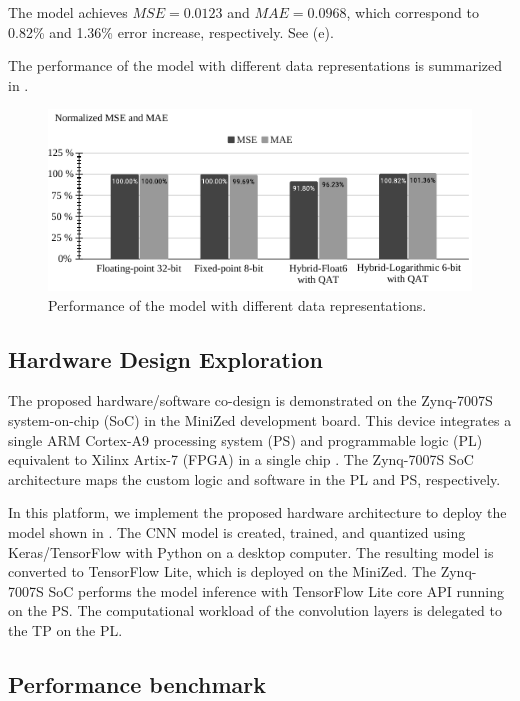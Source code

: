 The model achieves $MSE=0.0123$ and $MAE=0.0968$, which correspond to 0.82\% and 1.36\% error increase, respectively. See (e).

The performance of the model with different data representations is summarized in .

\begin{figure}[h!]
	\centering
	\includegraphics[width=\columnwidth]{../figures/histograms/Normalized_MSE_and_MAE.pdf}
	\caption{Performance of the model with different data representations.}
	\label{fig:normalized_mse_mae}
\end{figure}

\subsection{Hardware Design Exploration}
The proposed hardware/software co-design is demonstrated on the Zynq-7007S system-on-chip (SoC) in the MiniZed development board. This device integrates a single ARM Cortex-A9 processing system (PS) and programmable logic (PL) equivalent to Xilinx Artix-7 (FPGA) in a single chip \cite{xilinx2015zynq}. The Zynq-7007S SoC architecture maps the custom logic and software in the PL and PS, respectively.

In this platform, we implement the proposed hardware architecture to deploy the model shown in . The CNN model is created, trained, and quantized using Keras/TensorFlow with Python on a desktop computer. The resulting model is converted to TensorFlow Lite, which is deployed on the MiniZed. The Zynq-7007S SoC performs the model inference with TensorFlow Lite core API running on the PS. The computational workload of the convolution layers is delegated to the TP on the PL.

\subsection{Performance benchmark}
